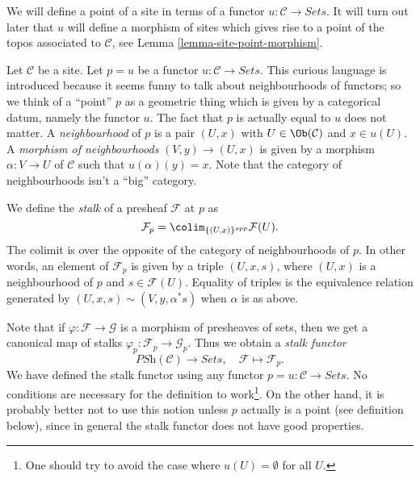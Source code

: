\noindent
We will define a point of a site in terms of a functor
$u : \mathcal{C} \to \textit{Sets}$.
It will turn out later that $u$ will define a morphism of sites
which gives rise to a point of the topos associated to $\mathcal{C}$, see
Lemma \ref{lemma-site-point-morphism}.

\medskip\noindent
Let $\mathcal{C}$ be a site. Let $p = u$ be
a functor $u : \mathcal{C} \to \textit{Sets}$.
This curious language is introduced because it
seems funny to talk about neighbourhoods of functors;
so we think of a ``point'' $p$ as a geometric thing which
is given by a categorical datum, namely the functor $u$.
The fact that $p$ is actually equal to $u$ does not matter.
A {\it neighbourhood} of $p$ is a pair $(U, x)$ with
$U \in \Ob(\mathcal{C})$ and $x \in u(U)$.
A {\it morphism of neighbourhoods} $(V, y) \to (U, x)$
is given by a morphism $\alpha :V \to U$ of $\mathcal{C}$
such that $u(\alpha)(y) = x$. Note that the category of
neighbourhoods isn't a ``big'' category.

\medskip\noindent
We define the {\it stalk} of a presheaf $\mathcal{F}$ at $p$ as
\begin{equation}
\label{equation-stalk}
\mathcal{F}_p = \colim_{\{(U, x)\}^{opp}} \mathcal{F}(U).
\end{equation}
The colimit is over the opposite of the category of
neighbourhoods of $p$. In other words, an element of
$\mathcal{F}_p$ is given by a triple $(U, x, s)$, where
$(U, x)$ is a neighbourhood of $p$ and $s \in \mathcal{F}(U)$. Equality
of triples is the equivalence relation generated by
$(U, x, s) \sim (V, y, \alpha^*s)$ when $\alpha$ is as above.

\medskip\noindent
Note that if $\varphi : \mathcal{F} \to \mathcal{G}$ is a morphism
of presheaves of sets, then we get a canonical map of stalks
$\varphi_p : \mathcal{F}_p \to \mathcal{G}_p$. Thus we obtain
a {\it stalk functor}
$$
\textit{PSh}(\mathcal{C}) \longrightarrow \textit{Sets}, \quad
\mathcal{F} \longmapsto \mathcal{F}_p.
$$
We have defined the stalk functor using any functor
$p = u : \mathcal{C} \to \textit{Sets}$. No conditions are
necessary for the definition to work\footnote{One should try to
avoid the case where $u(U) = \emptyset$ for all $U$.}. On the other hand,
it is probably better not to use this notion unless $p$
actually is a point (see definition below), since in general
the stalk functor does not have good properties.

